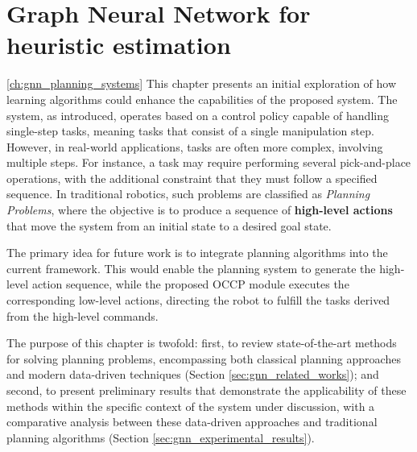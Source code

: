 \chapter{Graph Neural Network for heuristic estimation}
\ref{ch:gnn_planning_systems}
This chapter presents an initial exploration of how learning algorithms could enhance the capabilities of the proposed system. The system, as introduced, operates based on a control policy capable of handling single-step tasks, meaning tasks that consist of a single manipulation step. However, in real-world applications, tasks are often more complex, involving multiple steps. For instance, a task may require performing several pick-and-place operations, with the additional constraint that they must follow a specified sequence. In traditional robotics, such problems are classified as \textit{Planning Problems}, where the objective is to produce a sequence of \textbf{high-level actions} that move the system from an initial state to a desired goal state. 

The primary idea for future work is to integrate planning algorithms into the current framework. This would enable the planning system to generate the high-level action sequence, while the proposed OCCP module executes the corresponding low-level actions, directing the robot to fulfill the tasks derived from the high-level commands.

The purpose of this chapter is twofold: first, to review state-of-the-art methods for solving planning problems, encompassing both classical planning approaches and modern data-driven techniques (Section \ref{sec:gnn_related_works}); and second, to present preliminary results that demonstrate the applicability of these methods within the specific context of the system under discussion, with a comparative analysis between these data-driven approaches and traditional planning algorithms (Section \ref{sec:gnn_experimental_results}).




